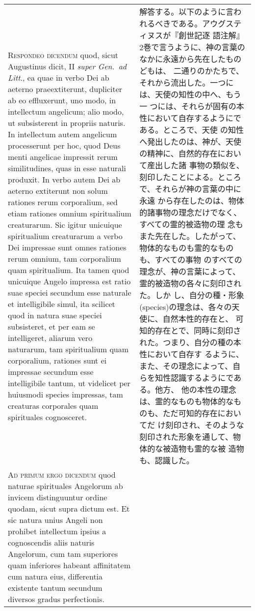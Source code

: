 \documentclass[10pt]{jsarticle} %
\begin{document}
\begin{longtable}{p{21em}p{21em}}
{\scshape Respondeo dicendum} quod, sicut Augustinus dicit, II
{\itshape super Gen.~ad Litt}., ea quae in verbo Dei ab aeterno
praeextiterunt, dupliciter ab eo effluxerunt, uno modo, in intellectum
angelicum; alio modo, ut subsisterent in propriis naturis. In
intellectum autem angelicum processerunt per hoc, quod Deus menti
angelicae impressit rerum similitudines, quas in esse naturali
produxit. In verbo autem Dei ab aeterno extiterunt non solum rationes
rerum corporalium, sed etiam rationes omnium spiritualium
creaturarum. Sic igitur unicuique spiritualium creaturarum a verbo Dei
impressae sunt omnes rationes rerum omnium, tam corporalium quam
spiritualium. Ita tamen quod unicuique Angelo impressa est ratio suae
speciei secundum esse naturale et intelligibile simul, ita scilicet
quod in natura suae speciei subsisteret, et per eam se intelligeret,
aliarum vero naturarum, tam spiritualium quam corporalium, rationes
sunt ei impressae secundum esse intelligibile tantum, ut videlicet per
huiusmodi species impressas, tam creaturas corporales quam spirituales
cognosceret.



&

解答する。以下のように言われるべきである。アウグスティヌスが『創世記逐
語注解』2巻で言うように、神の言葉のなかに永遠から先在したものどもは、
二通りのかたちで、それから流出した。一つには、天使の知性の中へ、もう一
つには、それらが固有の本性において自存するようにである。ところで、天使
の知性へ発出したのは、神が、天使の精神に、自然的存在において産出した諸
事物の類似を、刻印したことによる。ところで、それらが神の言葉の中に永遠
から存在したのは、物体的諸事物の理念だけでなく、すべての霊的被造物の理
念もまた先在した。したがって、物体的なものも霊的なものも、すべての事物
のすべての理念が、神の言葉によって、霊的被造物の各々に刻印された。しか
し、自分の種・形象(species)の理念は、各々の天使に、自然本性的存在と、
可知的存在とで、同時に刻印された。つまり、自分の種の本性において自存す
るように、また、その理念によって、自らを知性認識するようにである。他方、
他の本性の理念は、霊的なものも物体的なものも、ただ可知的存在においてだ
け刻印され、そのような刻印された形象を通して、物体的な被造物も霊的な被
造物も、認識した。





\\


{\scshape Ad primum ergo dicendum} quod naturae spirituales Angelorum
ab invicem distinguuntur ordine quodam, sicut supra dictum est. Et sic
natura unius Angeli non prohibet intellectum ipsius a cognoscendis
aliis naturis Angelorum, cum tam superiores quam inferiores habeant
affinitatem cum natura eius, differentia existente tantum secundum
diversos gradus perfectionis.



\end{longtable}
\end{document}
